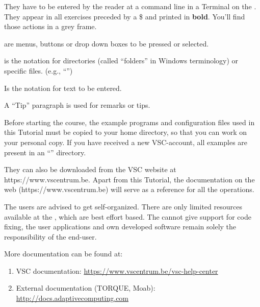 \begin{prompt}
\end{prompt}
They have to be entered by the reader at a command line in a Terminal on the \hpc. They appear in all exercises preceded by a \$ and printed in \textbf{bold}. You'll find those actions in a grey frame.

 are menus, buttons or drop down boxes to be pressed or selected.

 is the notation for directories (called ``folders'' in
Windows terminology) or specific files. (e.g., ``\homedir'')

 Is the notation for text to be entered.

\begin{tip}
A ``Tip'' paragraph is used for remarks or tips.
\end{tip}


Before starting the course, the example programs and configuration files used in this \hpc Tutorial must be copied to your home directory, so that you can work on your personal copy. If you have received a new VSC-account, all examples are present in an ``\examplesdir'' directory.

\begin{prompt}
\end{prompt}

They can also be downloaded from the VSC website at https://www.vscentrum.be.  Apart from this \hpc Tutorial, the \hpc documentation on the web (https://www.vscentrum.be) will serve as a reference for all the \hpc operations.


\begin{tip}
The users are advised to get self-organized. There are
only limited resources available at the \hpc, which are best effort based.
The \hpc cannot give support for code fixing, the user applications and own
developed software remain solely the responsibility of the end-user.
\end{tip}

More documentation can be found at:

\begin{enumerate}
  \item  VSC documentation: \url{https://www.vscentrum.be/vsc-help-center}
  \item  External documentation (TORQUE, Moab): \url{http://docs.adaptivecomputing.com}
\end{enumerate}

